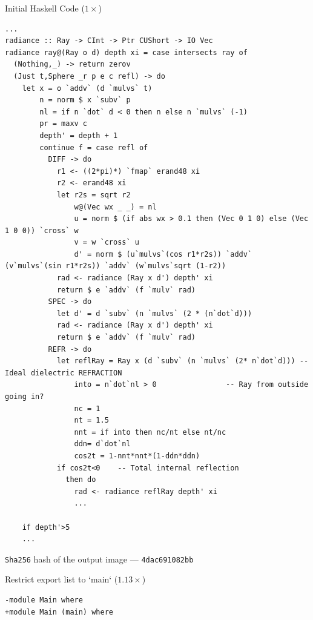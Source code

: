 \documentclass[8pt]{beamer}
\newcommand{\raw}[1]{\texttt{#1}}
\begin{document}
\begin{frame}[fragile]{Initial Haskell Code ($1\times$)}
\begin{verbatim}
...
radiance :: Ray -> CInt -> Ptr CUShort -> IO Vec
radiance ray@(Ray o d) depth xi = case intersects ray of
  (Nothing,_) -> return zerov
  (Just t,Sphere _r p e c refl) -> do
    let x = o `addv` (d `mulvs` t)
        n = norm $ x `subv` p
        nl = if n `dot` d < 0 then n else n `mulvs` (-1)
        pr = maxv c
        depth' = depth + 1
        continue f = case refl of
          DIFF -> do
            r1 <- ((2*pi)*) `fmap` erand48 xi
            r2 <- erand48 xi
            let r2s = sqrt r2
                w@(Vec wx _ _) = nl
                u = norm $ (if abs wx > 0.1 then (Vec 0 1 0) else (Vec 1 0 0)) `cross` w
                v = w `cross` u
                d' = norm $ (u`mulvs`(cos r1*r2s)) `addv` (v`mulvs`(sin r1*r2s)) `addv` (w`mulvs`sqrt (1-r2))
            rad <- radiance (Ray x d') depth' xi
            return $ e `addv` (f `mulv` rad)
          SPEC -> do
            let d' = d `subv` (n `mulvs` (2 * (n`dot`d)))
            rad <- radiance (Ray x d') depth' xi
            return $ e `addv` (f `mulv` rad)
          REFR -> do
            let reflRay = Ray x (d `subv` (n `mulvs` (2* n`dot`d))) -- Ideal dielectric REFRACTION
                into = n`dot`nl > 0                -- Ray from outside going in?
                nc = 1
                nt = 1.5
                nnt = if into then nc/nt else nt/nc
                ddn= d`dot`nl
                cos2t = 1-nnt*nnt*(1-ddn*ddn)
            if cos2t<0    -- Total internal reflection
              then do
                rad <- radiance reflRay depth' xi
                ...

    if depth'>5
    ...
\end{verbatim}
\raw{Sha256} hash of the output image --- \raw{4dac691082bb}
\end{frame}


\begin{frame}[fragile]{Restrict export list to `main` ($1.13\times$)}
\begin{verbatim}
-module Main where
+module Main (main) where
\end{verbatim}
\end{frame}

\end{document}

